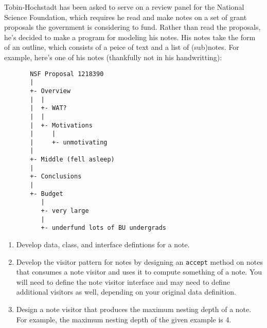 \documentclass[12pt]{article}                   %
\def\pts#1{\marginpar{\footnotesize \raggedright  \fbox{#1 {\sc Points}}}}
\begin{document}
\ifrubric
\else
{}
\fi
\newpage


\begin{problem} \pts{25}
\noindent
Tobin-Hochstadt has been asked to serve on a review panel for the
National Science Foundation, which requires he read and make notes on
a set of grant proposals the government is considering to fund.
Rather than read the proposals, he's decided to make a program for
modeling his notes.  His notes take the form of an outline, which
consists of a peice of text and a list of (sub)notes.  For example,
here's one of his notes (thankfully not in his handwritting):
\begin{verbatim}
       NSF Proposal 1218390
       |
       +- Overview
       |  |
       |  +- WAT?
       |  |
       |  +- Motivations
       |     |
       |     +- unmotivating
       |
       +- Middle (fell asleep)
       |
       +- Conclusions
       |
       +- Budget
          |
          +- very large
          |
          +- underfund lots of BU undergrads
\end{verbatim}


\newpage

\begin{enumerate}

\item Develop data, class, and interface defintions for a note.

\newpage

\noindent
\item Develop the visitor pattern for notes by designing
  an \texttt{accept} method on notes that
  consumes a note visitor and uses it to compute something of a note.
  You will need to define the note visitor interface and may need to
  define additional visitors as well, depending on your original data
  definition.

\newpage

\noindent
\item Design a note visitor that produces the maximum nesting depth of
  a note.  For example, the maximum nesting depth of the given example
  is 4.




\end{enumerate}
\end{problem}
\end{document}
